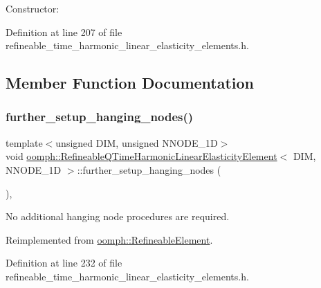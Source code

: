 Constructor\+: 



Definition at line 207 of file refineable\+\_\+time\+\_\+harmonic\+\_\+linear\+\_\+elasticity\+\_\+elements.\+h.



\subsection{Member Function Documentation}
\mbox{\label{classoomph_1_1RefineableQTimeHarmonicLinearElasticityElement_a498bb91cfc95d74f411634ab7a5dd065}} 
\subsubsection{\texorpdfstring{further\+\_\+setup\+\_\+hanging\+\_\+nodes()}{further\_setup\_hanging\_nodes()}}
{\footnotesize\ttfamily template$<$unsigned D\+IM, unsigned N\+N\+O\+D\+E\+\_\+1D$>$ \\
void \hyperlink{classoomph_1_1RefineableQTimeHarmonicLinearElasticityElement}{oomph\+::\+Refineable\+Q\+Time\+Harmonic\+Linear\+Elasticity\+Element}$<$ D\+IM, N\+N\+O\+D\+E\+\_\+1D $>$\+::further\+\_\+setup\+\_\+hanging\+\_\+nodes (\begin{DoxyParamCaption}{ }\end{DoxyParamCaption})\hspace{0.3cm}{\ttfamily [inline]}, {\ttfamily [virtual]}}



No additional hanging node procedures are required. 



Reimplemented from \hyperlink{classoomph_1_1RefineableElement_a86ea01c485f7ff822dce74b884312ccb}{oomph\+::\+Refineable\+Element}.



Definition at line 232 of file refineable\+\_\+time\+\_\+harmonic\+\_\+linear\+\_\+elasticity\+\_\+elements.\+h.

